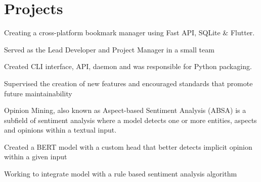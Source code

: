 \documentclass[]{resume-template}
\begin{document}
\begin{minipage}[t]{0.66\textwidth}


    \section{Projects}\label{sec:projects}

    \label{subsec: Bookie}
    \vspace{\topsep}
    \begin{tightemize}
        \item Creating a cross-platform bookmark manager using Fast API, SQLite \& Flutter.
        \item Served as the Lead Developer and Project Manager in a small team
        \item Created CLI interface, API, daemon and was responsible for Python packaging.
        \item Supervised the creation of new features and encouraged standards that promote future maintainability
    \end{tightemize}
    \vspace{\topsep}

    \label{subsec:opinionmining}
    \begin{tightemize}
        \item Opinion Mining, also known as Aspect-based Sentiment Analysis (ABSA) is a subfield of sentiment analysis
        where a model detects one or more entities, aspects and opinions within a textual input.
        \item Created a BERT model with a custom head that better detects implicit opinion within a given input
        \item Working to integrate model with a rule based sentiment analysis algorithm
    \end{tightemize}
    \vspace{\topsep}


\end{minipage}
\end{document}
